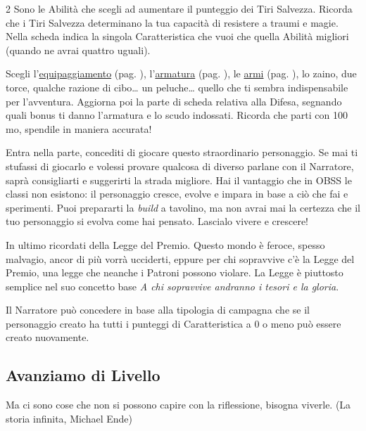 \begin{multicols}{2}
Sono le Abilità che scegli ad aumentare il punteggio dei Tiri Salvezza. Ricorda che i Tiri Salvezza determinano la tua capacità di resistere a traumi e magie. Nella scheda indica la singola Caratteristica che vuoi che quella Abilità migliori (quando ne avrai quattro uguali).

Scegli l'\hyperlink{equipaggiamento}{equipaggiamento} (pag. \pageref{equipaggiamento}), l'\hyperlink{equipaggiamento.armature.scudi}{armatura} (pag. \pageref{equipaggiamentoarmature}), le \hyperlink{equipaggiamento.armi}{armi} (pag. \pageref{equipaggiamentoarmi}), lo zaino, due torce, qualche razione di cibo… un peluche… quello che ti sembra indispensabile per l'avventura.
Aggiorna poi la parte di scheda relativa alla Difesa, segnando quali bonus ti danno l'armatura e lo scudo indossati. Ricorda che parti con 100 mo, spendile in maniera accurata!

Entra nella parte, concediti di giocare questo straordinario personaggio. Se mai ti stufassi di giocarlo e volessi provare qualcosa di diverso parlane con il Narratore, saprà consigliarti e suggerirti la strada migliore.
Hai il vantaggio che in OBSS le classi non esistono: il personaggio cresce, evolve e impara in base a ciò che fai e sperimenti. Puoi prepararti la \emph{build} a tavolino, ma non avrai mai la certezza che il tuo personaggio si evolva come hai pensato. Lascialo vivere e crescere!

In ultimo ricordati della Legge del Premio. Questo mondo è feroce, spesso malvagio, ancor di più vorrà ucciderti, eppure per chi sopravvive c'è la Legge del Premio, una legge che neanche i Patroni possono violare. La Legge è piuttosto semplice nel suo concetto base \emph{A chi sopravvive andranno i tesori e la gloria}.

\begin{narratore}
Il Narratore può concedere in base alla tipologia di campagna che se il personaggio creato ha tutti i punteggi di Caratteristica a 0 o meno può essere creato nuovamente.
\end{narratore}

\subsection{Avanziamo di Livello}\label{avanzamentodilivello}

\begin{enfasi}{
Ma ci sono cose che non si possono capire con la riflessione, bisogna viverle. (La storia infinita, Michael Ende)
}\end{enfasi}


\end{multicols}
